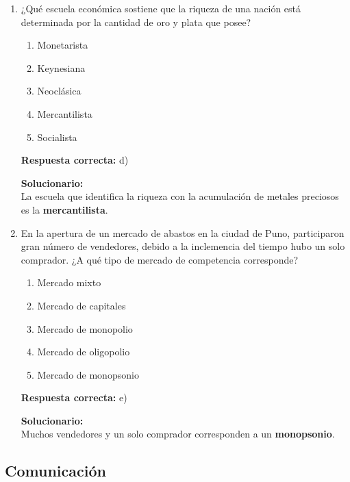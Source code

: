 \begin{enumerate}
	
	\item ¿Qué escuela económica sostiene que la riqueza de una nación está determinada por la cantidad de oro y plata que posee?
	\begin{enumerate}[label=\alph*)]
		\item Monetarista
		\item Keynesiana
		\item Neoclásica
		\item Mercantilista
		\item Socialista
	\end{enumerate}
	\textbf{Respuesta correcta:} d)
	
	\vspace{2mm}
	\textbf{Solucionario:}\\
	La escuela que identifica la riqueza con la acumulación de metales preciosos es la \textbf{mercantilista}.
	
	\vspace{6mm}
	
	\item En la apertura de un mercado de abastos en la ciudad de Puno, participaron gran número de vendedores, debido a la inclemencia del tiempo hubo un solo comprador. ¿A qué tipo de mercado de competencia corresponde?
	\begin{enumerate}[label=\alph*)]
		\item Mercado mixto
		\item Mercado de capitales
		\item Mercado de monopolio
		\item Mercado de oligopolio
		\item Mercado de monopsonio
	\end{enumerate}
	\textbf{Respuesta correcta:} e)
	
	\vspace{2mm}
	\textbf{Solucionario:}\\
	Muchos vendedores y un solo comprador corresponden a un \textbf{monopsonio}.
	
	\vspace{6mm}
	
\end{enumerate}

\subsection*{Comunicación}

